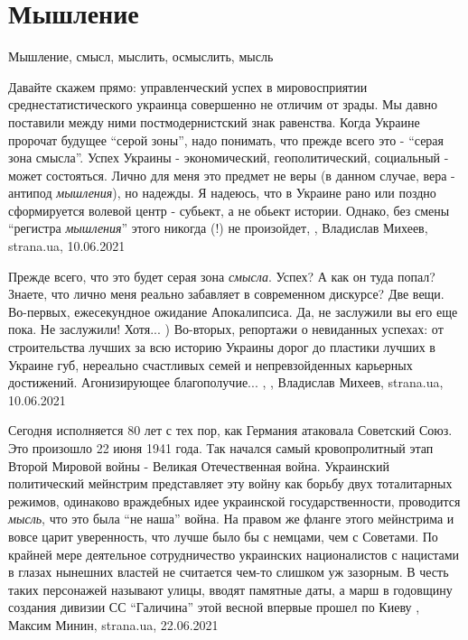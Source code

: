  
 
 
 
 
\chapter{Мышление}
\label{sec:slova.myshlenie}

Мышление, смысл, мыслить, осмыслить, мысль

Давайте скажем прямо: управленческий успех в мировосприятии
среднестатистического украинца совершенно не отличим от зрады.  Мы давно
поставили между ними постмодернистский знак равенства.  Когда Украине пророчат
будущее \enquote{серой зоны}, надо понимать, что прежде всего это -
\enquote{серая зона смысла}.  Успех Украины - экономический, геополитический,
социальный - может состояться. Лично для меня это предмет не веры (в данном
случае, вера - антипод \emph{мышления}), но надежды.  Я надеюсь, что в Украине рано
или поздно сформируется волевой центр - субьект, а не обьект истории.  Однако,
без смены \enquote{регистра \emph{мышления}} этого никогда (!) не произойдет,
, Владислав Михеев, strana.ua, 10.06.2021

Прежде всего, что это будет серая зона \emph{смысла}.  Успех? А как он туда
попал?  Знаете, что лично меня реально забавляет в современном дискурсе?  Две
вещи.  Во-первых, ежесекундное ожидание Апокалипсиса.  Да, не заслужили вы его
еще пока.  Не заслужили! Хотя... ) Во-вторых, репортажи о невиданных успехах:
от строительства лучших за всю историю Украины дорог до пластики лучших в
Украине губ, нереально счастливых семей и непревзойденных карьерных
достижений.  Агонизирующее благополучие... ,
, Владислав Михеев, strana.ua, 10.06.2021

Сегодня исполняется 80 лет с тех пор, как Германия атаковала Советский Союз.
Это произошло 22 июня 1941 года. Так начался самый кровопролитный этап Второй
Мировой войны - Великая Отечественная война.  Украинский политический мейнстрим
представляет эту войну как борьбу двух тоталитарных режимов, одинаково
враждебных идее украинской государственности, проводится \emph{мысль}, что это
была \enquote{не наша} война.  На правом же фланге этого мейнстрима и вовсе царит
уверенность, что лучше было бы с немцами, чем с Советами.  По крайней мере
деятельное сотрудничество украинских националистов с нацистами в глазах
нынешних властей не считается чем-то слишком уж зазорным. В честь таких
персонажей называют улицы, вводят памятные даты, а марш в годовщину создания
дивизии СС \enquote{Галичина} этой весной впервые прошел по Киеву
, 
Максим Минин, strana.ua, 22.06.2021

